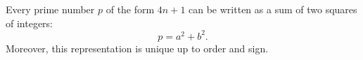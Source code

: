 Every prime number $p$ of the form $4n + 1$ can be written as a sum of two squares of integers:
$$p = a^2 + b^2.$$
Moreover, this representation is unique up to order and sign.
